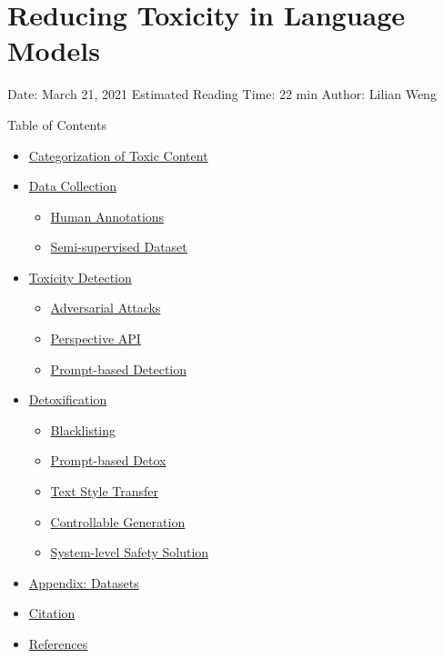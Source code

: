 \section{Reducing Toxicity in Language Models}\label{reducing-toxicity-in-language-models}

Date: March 21, 2021 \textbar{} Estimated Reading Time: 22 min \textbar{} Author: Lilian Weng

{Table of Contents}

\begin{itemize}
\tightlist
\item
  \hyperref[categorization-of-toxic-content]{Categorization of Toxic Content}
\item
  \hyperref[data-collection]{Data Collection}

  \begin{itemize}
  \tightlist
  \item
    \hyperref[human-annotations]{Human Annotations}
  \item
    \hyperref[semi-supervised-dataset]{Semi-supervised Dataset}
  \end{itemize}
\item
  \hyperref[toxicity-detection]{Toxicity Detection}

  \begin{itemize}
  \tightlist
  \item
    \hyperref[adversarial-attacks]{Adversarial Attacks}
  \item
    \hyperref[perspective-api]{Perspective API}
  \item
    \hyperref[prompt-based-detection]{Prompt-based Detection}
  \end{itemize}
\item
  \hyperref[detoxification]{Detoxification}

  \begin{itemize}
  \tightlist
  \item
    \hyperref[blacklisting]{Blacklisting}
  \item
    \hyperref[prompt-based-detox]{Prompt-based Detox}
  \item
    \hyperref[text-style-transfer]{Text Style Transfer}
  \item
    \hyperref[controllable-generation]{Controllable Generation}
  \item
    \hyperref[system-level-safety-solution]{System-level Safety Solution}
  \end{itemize}
\item
  \hyperref[appendix-datasets]{Appendix: Datasets}
\item
  \hyperref[citation]{Citation}
\item
  \hyperref[references]{References}
\end{itemize}

